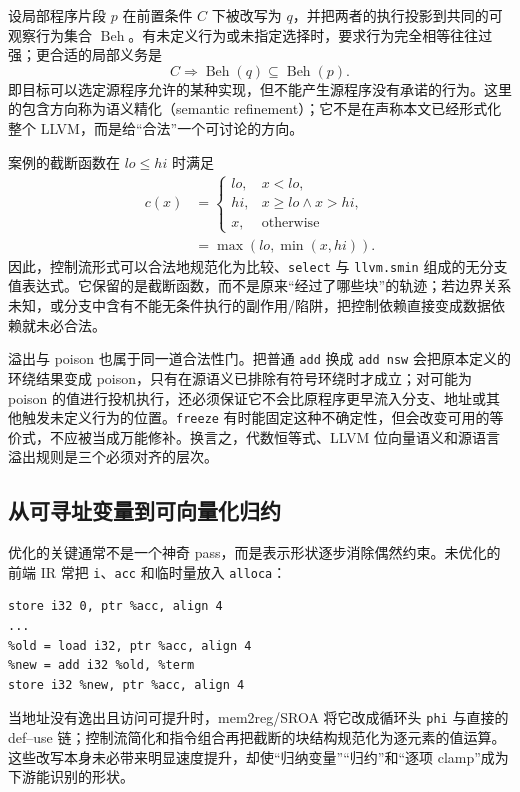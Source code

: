 设局部程序片段 \(p\) 在前置条件 \(C\) 下被改写为 \(q\)，并把两者的执行投影到共同的可观察行为集合 \(\operatorname{Beh}\)。有未定义行为或未指定选择时，要求行为完全相等往往过强；更合适的局部义务是
\begin{equation}
  C\Longrightarrow
  \operatorname{Beh}(q)\subseteq\operatorname{Beh}(p).
  \label{eq:local-refinement}
\end{equation}
即目标可以选定源程序允许的某种实现，但不能产生源程序没有承诺的行为。这里的包含方向称为语义精化（semantic refinement）；它不是在声称本文已经形式化整个 LLVM，而是给“合法”一个可讨论的方向\cite{llvm-alive2,llvm-vellvm2012}。

案例的截断函数在 \(lo\le hi\) 时满足
\[
  \begin{split}
  c(x)&=\begin{cases}
    lo,&x<lo,\\
    hi,&x\ge lo\land x>hi,\\
    x,&\text{otherwise}
  \end{cases}\\[-1mm]
  &=\max(lo,\min(x,hi)).
  \end{split}
\]
因此，控制流形式可以合法地规范化为比较、\texttt{select} 与 \texttt{llvm.smin} 组成的无分支值表达式。它保留的是截断函数，而不是原来“经过了哪些块”的轨迹；若边界关系未知，或分支中含有不能无条件执行的副作用/陷阱，把控制依赖直接变成数据依赖就未必合法。

溢出与 poison 也属于同一道合法性门。把普通 \texttt{add} 换成 \texttt{add nsw} 会把原本定义的环绕结果变成 poison，只有在源语义已排除有符号环绕时才成立；对可能为 poison 的值进行投机执行，还必须保证它不会比原程序更早流入分支、地址或其他触发未定义行为的位置。\texttt{freeze} 有时能固定这种不确定性，但会改变可用的等价式，不应被当成万能修补。换言之，代数恒等式、LLVM 位向量语义和源语言溢出规则是三个必须对齐的层次。

\subsection{从可寻址变量到可向量化归约}

优化的关键通常不是一个神奇 pass，而是表示形状逐步消除偶然约束。未优化的前端 IR 常把 \texttt{i}、\texttt{acc} 和临时量放入 \texttt{alloca}：
\begin{lstlisting}[language=LLVMIR,basicstyle=\ttfamily\scriptsize]
%acc = alloca i32, align 4
store i32 0, ptr %acc, align 4
...
%old = load i32, ptr %acc, align 4
%new = add i32 %old, %term
store i32 %new, ptr %acc, align 4
\end{lstlisting}
当地址没有逸出且访问可提升时，mem2reg/SROA 将它改成循环头 \texttt{phi} 与直接的 def--use 链；控制流简化和指令组合再把截断的块结构规范化为逐元素的值运算\cite{llvm-passdocs}。这些改写本身未必带来明显速度提升，却使“归纳变量”“归约”和“逐项 clamp”成为下游能识别的形状。

